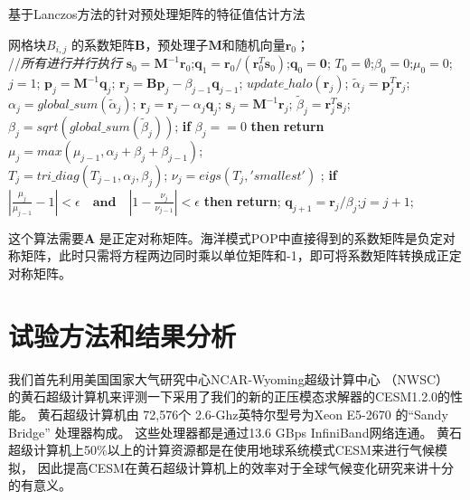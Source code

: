 \begin{algorithm}[!ht]
\caption{基于Lanczos方法的针对预处理矩阵的特征值估计方法}
\label{alg:lanczos_pre}
\begin{algorithmic}[1]
\REQUIRE 网格块$B_{i,j}$ 的系数矩阵$\textbf{B}$，预处理子$\textbf{M}$和随机向量$\textbf{r}_0$； \\
 //\qquad    \textit{所有进行并行执行}
\STATE $\textbf{s}_0=\textbf{M}^{-1}\textbf{r}_0$;\quad $\textbf{q}_1 = \textbf{r}_0/({\textbf{r}_0^T\textbf{s}_0})$;\quad $\textbf{q}_0=\textbf{0}$;
\STATE $T_0=\emptyset$;\quad $\beta_0 =0$;\quad  $\mu_0 =0$;\quad $j=1$;
\STATE $\textbf{p}_j = \textbf{M}^{-1}\textbf{q}_j$; \quad $\textbf{r}_j=\textbf{B}\textbf{p}_j-\beta_{j-1}\textbf{q}_{j-1}$;
\STATE $update\_halo(\textbf{r}_j)$;
\STATE $\tilde{\alpha}_j =\textbf{p}_j^T\textbf{r}_j$; \quad $\alpha_j=global\_sum(\tilde{\alpha}_j)$;
\STATE $\textbf{r}_j=\textbf{r}_j-\alpha_{j}\textbf{q}_{j}$; \quad $\textbf{s}_j = \textbf{M}^{-1}\textbf{r}_j$;
\STATE $\tilde{\beta}_j = \textbf{r}_j^T\textbf{s}_j$; \quad $\beta_j=sqrt(global\_sum(\tilde{\beta}_j))$;
\STATE \textbf{if} $\beta_j == 0$ \textbf{then} \textbf{return}
\STATE $\mu_j = max(\mu_{j-1},\alpha_j+\beta_j+\beta_{j-1})$; \label{lan_gersh}\\
\STATE $T_j=tri\_diag(T_{j-1},\alpha_j,\beta_j)$; \label{lan_tm}
\STATE $\nu_j = eigs(T_j,'smallest')$ ; \label{lan_nu}
\STATE \textbf{if} $|\frac{\mu_j}{\mu_{j-1}} -1 |< \epsilon\quad\textbf{and}\quad|1- \frac{\nu_j}{\nu_{j-1}}|< \epsilon$ \textbf{then} \textbf{return}; \label{lanczos_converge}
\STATE $\textbf{q}_{j+1}= \textbf{r}_j/\beta_j$;\quad $j=j+1$;
\ENDWHILE
\end{algorithmic}
\end{algorithm}

这个算法需要$\textbf{A}$ 是正定对称矩阵。海洋模式POP中直接得到的系数矩阵是负定对称矩阵，此时只需将方程两边同时乘以单位矩阵和-1，即可将系数矩阵转换成正定对称矩阵。 

\section{试验方法和结果分析}
\label{sec:precondExp}

 
我们首先利用美国国家大气研究中心NCAR-Wyoming超级计算中心
（NWSC） \cite{loft:2015}的黄石超级计算机来评测一下采用了我们的新的正压模态求解器的CESM1.2.0的性能。 
黄石超级计算机由 72,576个
2.6-Ghz英特尔型号为Xeon E5-2670 的``Sandy Bridge'' 处理器构成。 
这些处理器都是通过13.6 GBps InfiniBand网络连通。   
黄石超级计算机上50\%以上的计算资源都是在使用地球系统模式CESM来进行气候模拟， 
因此提高CESM在黄石超级计算机上的效率对于全球气候变化研究来讲十分的有意义\cite{wf2014}。 



